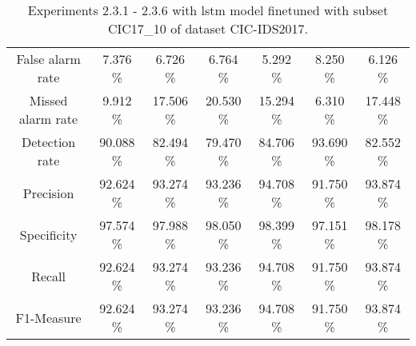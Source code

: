 \begin{table}[htb]
\begin{tabular}{@{}ccccccc@{}}
        False alarm rate &  7.376 \% &  6.726 \% &  6.764 \% &  5.292 \% &  8.250 \% &  6.126 \% \\
        Missed alarm rate &  9.912 \% &  17.506 \% &  20.530 \% &  15.294 \% &  6.310 \% &  17.448 \% \\
        Detection rate &  90.088 \% &  82.494 \% &  79.470 \% &  84.706 \% &  93.690 \% &  82.552 \% \\
        Precision &  92.624 \% &  93.274 \% &  93.236 \% &  94.708 \% &  91.750 \% &  93.874 \% \\
        Specificity &  97.574 \% &  97.988 \% &  98.050 \% &  98.399 \% &  97.151 \% &  98.178 \% \\
        Recall &  92.624 \% &  93.274 \% &  93.236 \% &  94.708 \% &  91.750 \% &  93.874 \% \\
        F1-Measure &  92.624 \% &  93.274 \% &  93.236 \% &  94.708 \% &  91.750 \% &  93.874 \% \\
        \bottomrule
    \end{tabular}
    \caption{Experiments 2.3.1 - 2.3.6 with \gls{lstm} model finetuned with subset CIC17\_10 of dataset CIC-IDS2017.}
    \label{table:results:lstm:flows_subset}
\end{table}